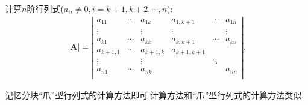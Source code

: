 \documentclass[../../main.tex]{subfiles}%
\begin{document}
\begin{proposition}[分块“爪”型行列式]\label{proposition:分块爪型行列式}
计算$n$阶行列式($a_{ii}\ne 0,i=k+1,k+2,\cdots,n$):
\begin{align*}
|\boldsymbol{A}|=\left| \begin{matrix}
a_{11}&		\cdots&		a_{1k}&		a_{1,k+1}&		\cdots&		a_{1n}\\
\vdots&		&		\vdots&		\vdots&		&		\vdots\\
a_{k1}&		\cdots&		a_{kk}&		a_{k,k+1}&		\cdots&		a_{kn}\\
a_{k+1,1}&		\cdots&		a_{k+1,k}&		a_{k+1,k+1}&		&		\\
\vdots&		&		\vdots&		&		\ddots&		\\
a_{n1}&		\cdots&		a_{nk}&		&		&		a_{nn}\\
\end{matrix} \right|.
\end{align*}
\end{proposition}
\begin{note}
记忆分块“爪”型行列式的计算方法即可,计算方法和“爪”型行列式的计算方法类似.
\end{note}
\end{document}
